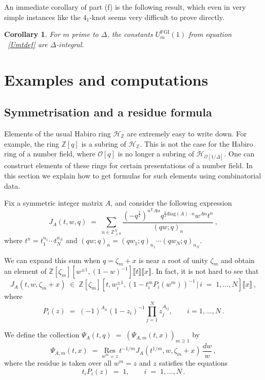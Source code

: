 \documentclass[12pt,reqno]{amsart}
\newtheorem{corollary}[proposition]{Corollary}
\theoremstyle{definition}
\def\BZ{\mathbb Z}
\def\calH{\mathcal H}
\def\Res#1{\underset{#1}{\mathrm{Res}}\,}
\def\be{\begin{equation}}
\def\ee{\end{equation}}
\def\z{\zeta}
\def\diag{\mathrm{diag}}
\def\calO{\mathcal{O}}
\def\={\;=\;}
\def\inn{\;\in\;}
\def\Tran{\mathrm{T}}
\def\FGI{\mathrm{FGI}}
\begin{document}
An immediate corollary of part (f) is the following result, which even in very simple
instances like the $4_1$-knot
seems very difficult to prove directly.

\begin{corollary}
For $m$ prime to $\Delta$, the constants $U_{m}^\FGI(1)$ from equation
~\eqref{Umtdef} are $\Delta$-integral.
\end{corollary}


\section{Examples and computations}
\label{sec.examples}

\subsection{Symmetrisation and a residue formula}
\label{sub.sym}

Elements of the usual Habiro ring $\calH_{\BZ}$ are extremely easy to write down.
For example, the ring $\BZ[q]$ is a subring of $\calH_{\BZ}$. This is not the case
for the Habiro ring of a number field, where $\calO[q]$ is no longer a subring
of $\calH_{\calO[1/\Delta]}$. One can construct
elements of these rings for certain presentations of a number field. In this section
we explain how to get formulas for such elements using combinatorial data. 

Fix a symmetric integer matrix $A$, and consider the following expression
\be
J_A(t,w,q)
\=
\sum_{n\in\BZ^N_{\geq0}}
\frac{(-q^{\frac{1}{2}})^{n^{\Tran}An}q^{\frac{1}{2}\diag(A)\cdot n}w^{An}
t^n}{(qw;q)_n}\,,
\ee
where $t^n=t_1^{n_1}\cdots t_N^{n_N}$ and
$(qw;q)_n=(qw_1;q)_{n_{1}}\cdots(qw_N;q)_{n_{N}}$.

We can expand this sum when $q=\z_m+x$
is near a root of unity $\z_m$ and obtain an element
of $\BZ[\z_m][w^{\pm1},(1-w)^{-1}]\llbracket t\rrbracket\llbracket x \rrbracket$.
In fact, it is not hard to see that 
\be
\label{Jwdef}
J_A(t,w,\z_m+x) \inn \BZ[\z_m][t,w_i^{\pm1},
(1-t_i^{m}P_i(w^{m}))^{-1} \, | \, i\=1,\dots,N]
\llbracket x\rrbracket\,,
\ee
where
\be
\label{ABge}
P_{i}(z)\= (-1)^{A_{ii}} (1-z_i)^{-1} \prod_{j=1}^N z_j^{A_{ij}},\qquad i=1,\dots,N\,.
\ee

We define the collection $\Psi_A(t,q) \= (\Psi_{A,m}(t,x))_{m \geq 1}$ by
\be
\label{psitmdef}
\Psi_{A,m}(t,x)
\=
\Res{w^{m}=z}
t^{-1/m}J_A(t^{1/m},w,\z_m+x)\,\frac{dw}{w}\,,
\ee
where the residue is taken over all $w^{m}=z$ and $z$ satisfies the equations
\be
\label{tpz}
t_i P_i(z)\=1, \qquad i\=1,\dots, N \,. 
\ee
\end{document}
